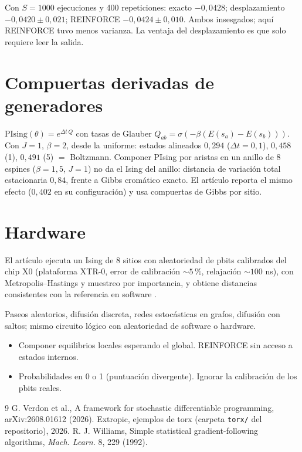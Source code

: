 \documentclass[11pt,a4paper]{article}
\begin{document}
Con $S=1000$ ejecuciones y 400 repeticiones: exacto $-0{,}0428$; desplazamiento $-0{,}0420\pm0{,}021$; REINFORCE $-0{,}0424\pm0{,}010$. Ambos insesgados; aquí
REINFORCE tuvo menos varianza. La ventaja del desplazamiento es que solo requiere leer la salida.

\section{Compuertas derivadas de generadores}
$\mathrm{PIsing}(\theta)=e^{\Delta t\,Q}$ con tasas de Glauber $Q_{ab}=\sigma(-\beta(E(s_a)-E(s_b)))$. Con $J=1$, $\beta=2$, desde la uniforme: estados alineados
$0{,}294$ ($\Delta t=0{,}1$), $0{,}458$ (1), $0{,}491$ (5) $=$ Boltzmann. Componer PIsing por aristas en un anillo de 8 espines ($\beta=1{,}5$, $J=1$) no da el Ising del
anillo: distancia de variación total estacionaria $0{,}84$, frente a Gibbs cromático exacto. El artículo reporta el mismo efecto ($0{,}402$ en su configuración) y usa
compuertas de Gibbs por sitio.

\section{Hardware}
El artículo ejecuta un Ising de 8 sitios con aleatoriedad de pbits calibrados del chip X0 (plataforma XTR-0, error de calibración $\sim5\,\%$, relajación $\sim100$ ns),
con Metropolis--Hastings y muestreo por importancia, y obtiene distancias consistentes con la referencia en software \evP.

\begin{aplicacion}
Paseos aleatorios, difusión discreta, redes estocásticas en grafos, difusión con saltos; mismo circuito lógico con aleatoriedad de software o hardware.
\end{aplicacion}

\begin{error}
\begin{itemize}[nosep]
\item Componer equilibrios locales esperando el global. \quad REINFORCE sin acceso a estados internos.
\item Probabilidades en 0 o 1 (puntuación divergente). \quad Ignorar la calibración de los pbits reales.
\end{itemize}
\end{error}

\begin{thebibliography}{9}\small
{} G. Verdon et al., A framework for stochastic differentiable programming, arXiv:2608.01612 (2026).
 Extropic, ejemplos de torx (carpeta \texttt{torx/} del repositorio), 2026.
 R. J. Williams, Simple statistical gradient-following algorithms, \emph{Mach. Learn.} 8, 229 (1992).
\end{thebibliography}
\end{document}
